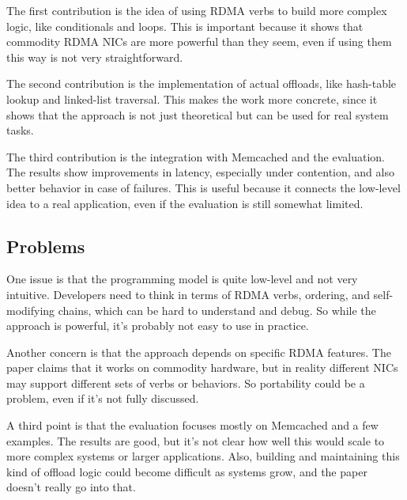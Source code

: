 \documentclass[a4paper, 12pt]{article}
\begin{document}
The first contribution is the idea of using RDMA verbs to build more complex logic, like conditionals and loops. This is important because it shows that commodity RDMA NICs are more powerful than they seem, even if using them this way is not very straightforward.

The second contribution is the implementation of actual offloads, like hash-table lookup and linked-list traversal. This makes the work more concrete, since it shows that the approach is not just theoretical but can be used for real system tasks.

The third contribution is the integration with Memcached and the evaluation. The results show improvements in latency, especially under contention, and also better behavior in case of failures. This is useful because it connects the low-level idea to a real application, even if the evaluation is still somewhat limited.

\subsection{Problems}

One issue is that the programming model is quite low-level and not very intuitive. Developers need to think in terms of RDMA verbs, ordering, and self-modifying chains, which can be hard to understand and debug. So while the approach is powerful, it’s probably not easy to use in practice.

Another concern is that the approach depends on specific RDMA features. The paper claims that it works on commodity hardware, but in reality different NICs may support different sets of verbs or behaviors. So portability could be a problem, even if it’s not fully discussed.

A third point is that the evaluation focuses mostly on Memcached and a few examples. The results are good, but it’s not clear how well this would scale to more complex systems or larger applications. Also, building and maintaining this kind of offload logic could become difficult as systems grow, and the paper doesn’t really go into that.
\end{document}

